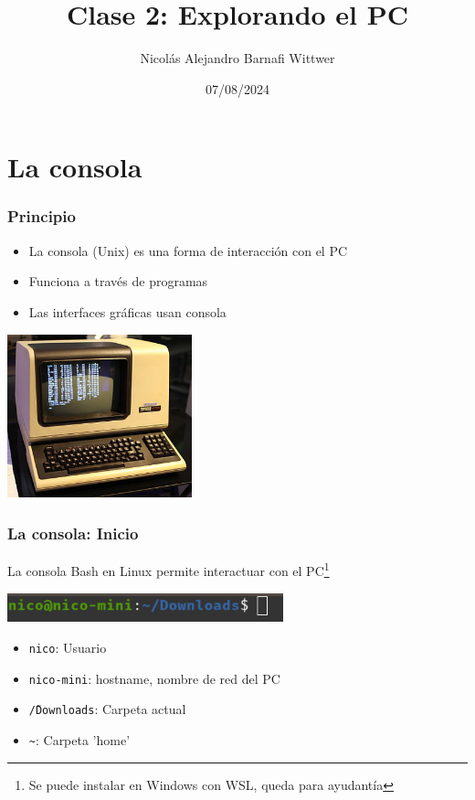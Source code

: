 \documentclass[14pt,aspectratio=169,xcolor=dvipsnames]{beamer}
\title[short title]{Clase 2: Explorando el PC}
\subtitle{}
\author[NA Barnafi] {Nicolás Alejandro Barnafi Wittwer}
\institute[UC|CMM] 
{
    Pontificia Universidad Católica de Chile \\
    Centro de Modelamiento Matemático
}
\date{07/08/2024}
\begin{document}
\begin{frame}
    \maketitle
\end{frame}
\section{La consola}
\begin{frame}\frametitle{Principio}
    \begin{itemize}
        \item La consola (Unix) es una forma de interacción con el PC
        \item Funciona a través de programas
        \item Las interfaces gráficas usan consola
    \end{itemize}
    \begin{flushright}
        \includegraphics[width=0.4\textwidth]{../images/os-unix.png}
    \end{flushright}
\end{frame}
\begin{frame}\frametitle{La consola: Inicio}
La consola Bash en Linux permite interactuar con el PC\footnote{Se puede instalar en Windows con WSL, queda para ayudantía}

    \begin{center}
        \includegraphics[width=0.6\textwidth]{../images/consola.png}
    \end{center}
\begin{itemize}
    \item \texttt{nico}: Usuario
    \item \texttt{nico-mini}: hostname, nombre de red del PC
    \item \texttt{\~/Downloads}: Carpeta actual
    \item \texttt{\~}: Carpeta 'home'
\end{itemize}
\end{frame}
\end{document}
